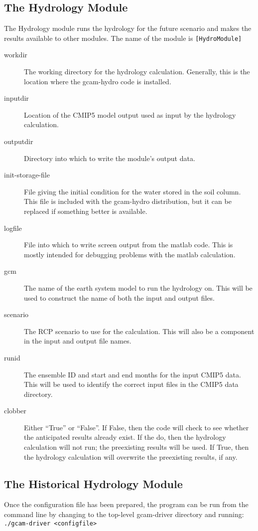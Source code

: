 \documentclass[11pt]{article}
\begin{document}
\subsection{The Hydrology Module}
The Hydrology module runs the hydrology for the future scenario and
makes the results available to other modules.  The name of the module
is \texttt{[HydroModule]}
\begin{description}
\item[workdir] The working directory for the hydrology calculation.
  Generally, this is the location where the gcam-hydro code is
  installed.
\item[inputdir] Location of the CMIP5 model output used as input by the
  hydrology calculation.
\item[outputdir] Directory into which to write the module's output
  data.
\item[init-storage-file] File giving the initial condition for the
  water stored in the soil column.  This file is included with the
  gcam-hydro distribution, but it can be replaced if something better
  is available.
\item[logfile] File into which to write screen output from the matlab
  code.  This is mostly intended for debugging problems with the
  matlab calculation.
\item[gcm] The name of the earth system model to run the hydrology
  on.  This will be used to construct the name of both the input and
  output files.
\item[scenario] The RCP scenario to use for the calculation.  This
  will also be a component in the input and output file names.
\item[runid] The ensemble ID and start and end months for the input
  CMIP5 data.  This will be used to identify the correct input files
  in the CMIP5 data directory.
\item[clobber] Either ``True'' or ``False''.  If False, then the code
  will check to see whether the anticipated results already exist.  If
  the do, then the hydrology calculation will not run; the preexisting
  results will be used.  If True, then the hydrology calculation will
  overwrite the preexisting results, if any.
\end{description}

\subsection{The Historical Hydrology Module}

Once the configuration file has been prepared, the program can be run
from the command line by changing to the 
top-level gcam-driver directory and running:\\
\texttt{./gcam-driver <configfile>}\\ 
\end{document}
